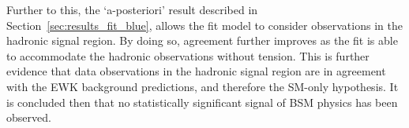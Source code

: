 Further to this, the `a-posteriori' result described in Section~\ref{sec:results_fit_blue},
allows the fit model to consider observations
in the hadronic signal region. By doing so, agreement further improves as the fit is able
to accommodate the hadronic observations without tension. This is further evidence that
data observations in the hadronic signal region are in agreement with the EWK background
predictions, and therefore the SM-only hypothesis. It is concluded then that no statistically
significant signal of BSM physics has been observed.
